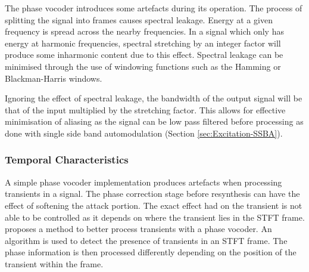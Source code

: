 			The phase vocoder introduces some artefacts during its operation. The process of splitting the
			signal into frames causes spectral leakage. Energy at a given frequency is spread across the nearby
			frequencies. In a signal which only has energy at harmonic frequencies, spectral stretching by an
			integer factor will produce some inharmonic content due to this effect. Spectral leakage can be
			minimised through the use of windowing functions such as the Hamming or Blackman-Harris windows. 

			Ignoring the effect of spectral leakage, the bandwidth of the output signal will be that of the
			input multiplied by the stretching factor. This allows for effective minimisation of aliasing as
			the signal can be low pass filtered before processing as done with single side band automodulation
			(Section \ref{sec:Excitation-SSBA}).
		
		\subsubsection*{Temporal Characteristics}
			A simple phase vocoder implementation produces artefacts when processing transients in a signal.
			The phase correction stage before resynthesis can have the effect of softening the attack portion.
			The exact effect had on the transient is not able to be controlled as it depends on where the
			transient lies in the STFT frame. \citet{robel2003a} proposes a method to better process transients
			with a phase vocoder. An algorithm is used to detect the presence of transients in an STFT frame.
			The phase information is then processed differently depending on the position of the transient
			within the frame.


